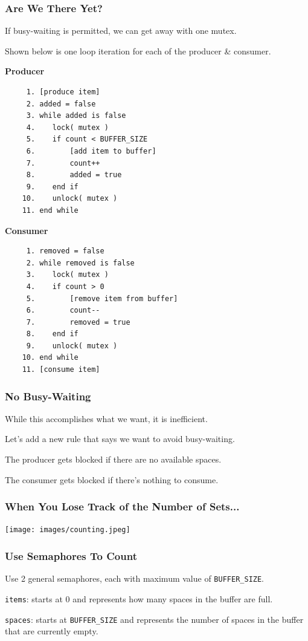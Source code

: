 \begin{frame}[fragile]
	\frametitle{Are We There Yet?}

	If busy-waiting is permitted, we can get away with one mutex.

	Shown below is one loop iteration for each of the producer \& consumer.
		{\small
			\begin{multicols}{2}
				\textbf{Producer}
				\begin{verbatim}
	 1. [produce item]
	 2. added = false
	 3. while added is false
	 4.    lock( mutex )
	 5.    if count < BUFFER_SIZE
	 6.        [add item to buffer]
	 7.        count++
	 8.        added = true
	 9.    end if
	10.    unlock( mutex )
	11. end while
  				\end{verbatim}
				\columnbreak
				\textbf{Consumer}\vspace{-2em}
				\begin{verbatim}
	 1. removed = false
	 2. while removed is false
	 3.    lock( mutex )
	 4.    if count > 0
	 5.        [remove item from buffer]
	 6.        count--
	 7.        removed = true
	 8.    end if
	 9.    unlock( mutex )
	10. end while
	11. [consume item]
  				\end{verbatim}
			\end{multicols}
			\vspace{-2em}
		}

\end{frame}


\begin{frame}
	\frametitle{No Busy-Waiting}

	While this accomplishes what we want, it is inefficient.

	Let's add a new rule that says we want to avoid busy-waiting.

	The producer gets blocked if there are no available spaces.

	The consumer gets blocked if there's nothing to consume.

\end{frame}


\begin{frame}
	\frametitle{When You Lose Track of the Number of Sets...}

	\begin{center}
		\texttt{[image: images/counting.jpeg]}
	\end{center}

\end{frame}


\begin{frame}
	\frametitle{Use Semaphores To Count}

	Use 2 general semaphores, each with maximum value of \texttt{BUFFER\_SIZE}.

	\texttt{items}: starts at 0 and represents how many spaces in the buffer are full.

	\texttt{spaces}: starts at \texttt{BUFFER\_SIZE} and represents the number of spaces in the buffer that are currently empty.

\end{frame}


